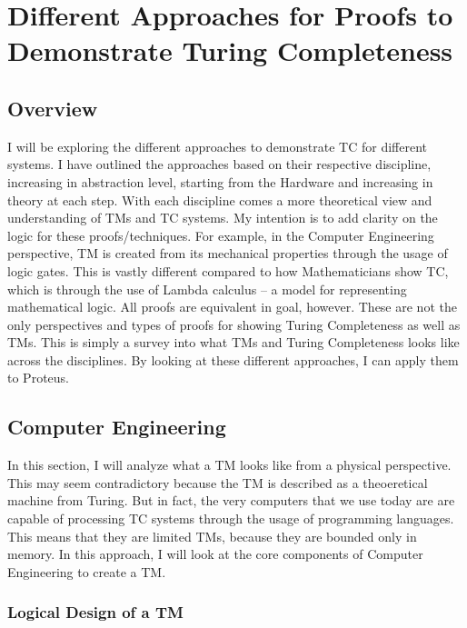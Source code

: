 \chapter{Different Approaches for Proofs to Demonstrate Turing Completeness}\label{chapter:ProofApproachesForTC}

\section{Overview}\label{sec:ProofOverview}

I will be exploring the different approaches to demonstrate TC for different systems.
I have outlined the approaches based on their respective discipline, increasing in abstraction level, starting from the Hardware and increasing in theory at each step.
With each discipline comes a more theoretical view and understanding of TMs and TC systems.
My intention is to add clarity on the logic for these proofs/techniques.
For example, in the Computer Engineering perspective, TM is created from its mechanical properties through the usage of logic gates.
This is vastly different compared to how Mathematicians show TC, which is through the use of Lambda calculus -- a model for representing mathematical logic.
All proofs are equivalent in goal, however.
These are not the only perspectives and types of proofs for showing Turing Completeness as well as TMs.
This is simply a survey into what TMs and Turing Completeness looks like across the disciplines.
By looking at these different approaches, I can apply them to Proteus.

\section{Computer Engineering}\label{sec:CE}

In this section, I will analyze what a TM looks like from a physical perspective.
This may seem contradictory because the TM is described as a theoeretical machine from Turing.
But in fact, the very computers that we use today are are capable of processing TC systems through the usage of programming languages.
This means that they are limited TMs, because they are bounded only in memory.
In this approach, I will look at the core components of Computer Engineering to create a TM.

\subsection{Logical Design of a TM}\label{subsec:TMLogicalDesign}

